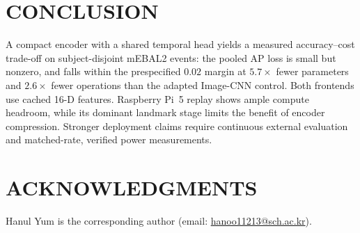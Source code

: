 \documentclass{IEEEmce}
\begin{document}
\section{CONCLUSION}
A compact encoder with a shared temporal head yields a measured accuracy--cost
trade-off on subject-disjoint mEBAL2 events: the pooled AP loss is small but nonzero,
and falls within the prespecified $0.02$ margin at $5.7\times$ fewer parameters and
$2.6\times$ fewer operations than the adapted Image-CNN control. Both frontends use
cached 16-D features. Raspberry Pi~5 replay shows ample compute headroom, while its
dominant landmark stage limits the benefit of encoder compression. Stronger deployment
claims require continuous external evaluation and matched-rate, verified power measurements.


\section{ACKNOWLEDGMENTS}
Hanul Yum is the corresponding author
(email: \href{mailto:hanoo11213@sch.ac.kr}{hanoo11213@sch.ac.kr}).
\end{document}

